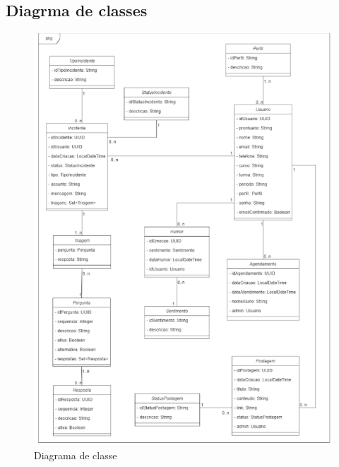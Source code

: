 \documentclass[12pt,a4paper]{article}
\begin{document}
\newpage

\subsection{Diagrma de classes}
\begin{figure}[H]
    \centering
     \includegraphics[width=15cm]{diagram.png}
    \caption{Diagrama de classe}
    \label{dia}
\end{figure}

\newpage
\end{document}
